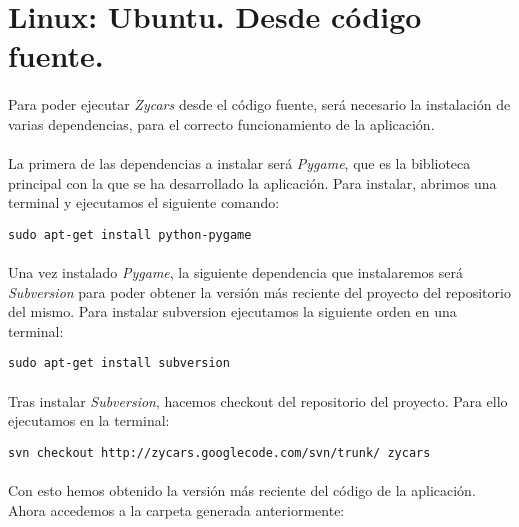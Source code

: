 \section{Linux: Ubuntu. Desde código fuente.}

\paragraph{}
Para poder ejecutar \emph{Zycars} desde el código fuente, será necesario la instalación de varias
dependencias, para el correcto funcionamiento de la aplicación.

\paragraph{}
La primera de las dependencias a instalar será \emph{Pygame}, que es la biblioteca principal con la que
se ha desarrollado la aplicación. Para instalar, abrimos una terminal y ejecutamos el siguiente comando:

\begin{lstlisting}[style=consola, numbers=none]
sudo apt-get install python-pygame
\end{lstlisting}

\paragraph{}
Una vez instalado \emph{Pygame}, la siguiente dependencia que instalaremos será \emph{Subversion} para poder
obtener la versión más reciente del proyecto del repositorio del mismo. Para instalar subversion ejecutamos 
la siguiente orden en una terminal:

\begin{lstlisting}[style=consola, numbers=none]
sudo apt-get install subversion
\end{lstlisting}

\paragraph{}
Tras instalar \emph{Subversion}, hacemos checkout del repositorio del proyecto. Para ello ejecutamos en la terminal:

\begin{lstlisting}[style=consola, numbers=none]
svn checkout http://zycars.googlecode.com/svn/trunk/ zycars
\end{lstlisting}

\paragraph{}
Con esto hemos obtenido la versión más reciente del código de la aplicación. Ahora accedemos a la carpeta generada
anteriormente:

